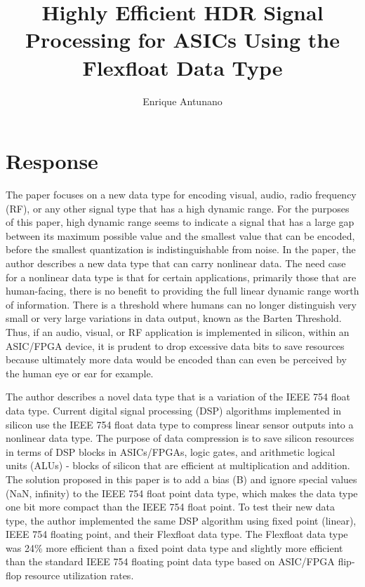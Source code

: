 \documentclass{article}
\title{Highly Efficient HDR Signal Processing for ASICs
Using the Flexfloat Data Type}
\author{Enrique Antunano}
\begin{document}
\maketitle

\section{Response}
The paper focuses on a new data type for encoding visual, audio, radio frequency (RF), or any other signal type that has a high dynamic range. For the purposes of this paper, high dynamic range seems to indicate a signal that has a large gap between its maximum possible value and the smallest value that can be encoded, before the smallest quantization is indistinguishable from noise. In the paper, the author describes a new data type that can carry nonlinear data. The need case for a nonlinear data type is that for certain applications, primarily those that are human-facing, there is no benefit to providing the full linear dynamic range worth of information. There is a threshold where humans can no longer distinguish very small or very large variations in data output, known as the Barten Threshold. Thus, if an audio, visual, or RF application is implemented in silicon, within an ASIC/FPGA device, it is prudent to drop excessive data bits to save resources because ultimately more data would be encoded than can even be perceived by the human eye or ear for example.

The author describes a novel data type that is a variation of the IEEE 754 float data type. Current digital signal processing (DSP) algorithms implemented in silicon use the IEEE 754 float data type to compress linear sensor outputs into a nonlinear data type. The purpose of data compression is to save silicon resources in terms of DSP blocks in ASICs/FPGAs, logic gates, and arithmetic logical units (ALUs) - blocks of silicon that are efficient at multiplication and addition. The solution proposed in this paper is to add a bias (B) and ignore special values (NaN, infinity) to the IEEE 754 float point data type, which makes the data type one bit more compact than the IEEE 754 float point. To test their new data type, the author implemented the same DSP algorithm using fixed point (linear), IEEE 754 floating point, and their Flexfloat data type. The Flexfloat data type was 24\% more efficient than a fixed point data type and slightly more efficient than the standard IEEE 754 floating point data type based on ASIC/FPGA flip-flop resource utilization rates.
\end{document}
